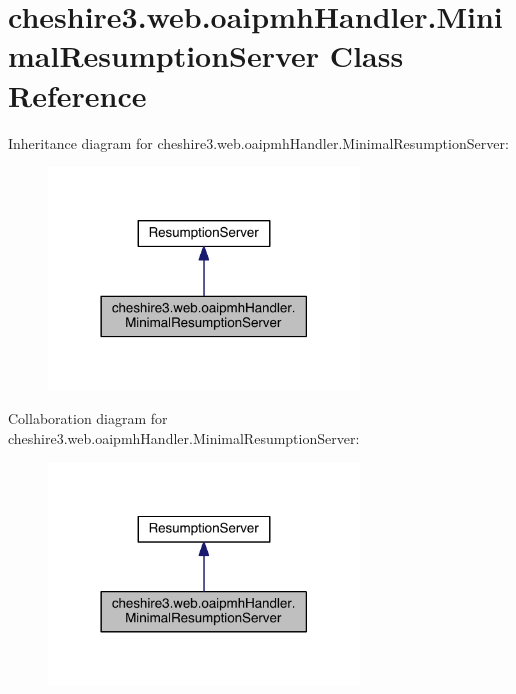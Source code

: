 \hypertarget{classcheshire3_1_1web_1_1oaipmh_handler_1_1_minimal_resumption_server}{\section{cheshire3.\-web.\-oaipmh\-Handler.\-Minimal\-Resumption\-Server Class Reference}
\label{classcheshire3_1_1web_1_1oaipmh_handler_1_1_minimal_resumption_server}
}


Inheritance diagram for cheshire3.\-web.\-oaipmh\-Handler.\-Minimal\-Resumption\-Server\-:
\nopagebreak
\begin{figure}[H]
\begin{center}
\leavevmode
\includegraphics[width=234pt]{classcheshire3_1_1web_1_1oaipmh_handler_1_1_minimal_resumption_server__inherit__graph}
\end{center}
\end{figure}


Collaboration diagram for cheshire3.\-web.\-oaipmh\-Handler.\-Minimal\-Resumption\-Server\-:
\nopagebreak
\begin{figure}[H]
\begin{center}
\leavevmode
\includegraphics[width=234pt]{classcheshire3_1_1web_1_1oaipmh_handler_1_1_minimal_resumption_server__coll__graph}
\end{center}
\end{figure}
